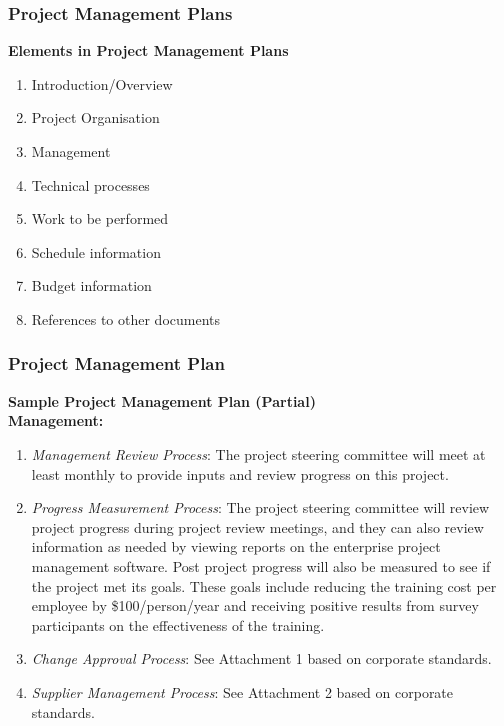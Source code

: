 \documentclass[aspectratio=169]{beamer}
\begin{document}
\begin{frame}
\frametitle{Project Management Plans}
\begin{tcolorbox}
\textbf{Elements in Project Management Plans}
\begin{enumerate}
\item Introduction/Overview
\item Project Organisation
\item Management
\item Technical processes
\item Work to be performed
\item Schedule information
\item Budget information
\item References to other documents
\end{enumerate}
\end{tcolorbox}
\end{frame}

\begin{frame}
\frametitle{Project Management Plan}
\textbf{Sample Project Management Plan (Partial)}\\
\vspace{0.5cm}
\small
\textbf{Management:}
\begin{enumerate}
\item \textit{Management Review Process}: The project steering committee will meet at least monthly to provide inputs and review progress on this project.
\item \textit{Progress Measurement Process}: The project steering committee will review project progress during project review meetings, and they can also review information as needed by viewing reports on the enterprise project management software. Post project progress will also be measured to see if the project met its goals. These goals include reducing the training cost per employee by \$100/person/year and receiving positive results from survey participants on the effectiveness of the training.
\item \textit{Change Approval Process}: See Attachment 1 based on corporate standards.
\item \textit{Supplier Management Process}: See Attachment 2 based on corporate standards.
\end{enumerate}
\end{frame}
\end{document}
